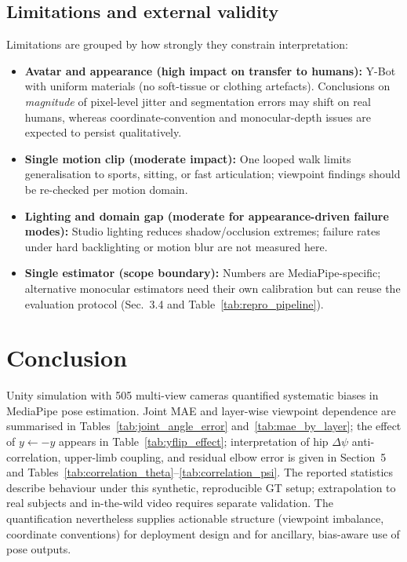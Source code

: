 \documentclass[english,fleqn]{ieej-e}
\begin{document}
\subsection{Limitations and external validity}

Limitations are grouped by how strongly they constrain interpretation:
\begin{itemize}\itemsep2pt
  \item \textbf{Avatar and appearance (high impact on transfer to humans):}
        Y-Bot with uniform materials (no soft-tissue or clothing
        artefacts). Conclusions on \emph{magnitude} of pixel-level jitter
        and segmentation errors may shift on real humans, whereas
        coordinate-convention and monocular-depth issues are expected to
        persist qualitatively.
  \item \textbf{Single motion clip (moderate impact):}
        One looped walk limits generalisation to sports, sitting, or
        fast articulation; viewpoint findings should be re-checked per
        motion domain.
  \item \textbf{Lighting and domain gap (moderate for appearance-driven
        failure modes):}
        Studio lighting reduces shadow/occlusion extremes; failure rates
        under hard backlighting or motion blur are not measured here.
  \item \textbf{Single estimator (scope boundary):}
        Numbers are MediaPipe-specific; alternative monocular estimators
        need their own calibration but can reuse the evaluation protocol
        (Sec.~3.4 and Table~\ref{tab:repro_pipeline}).
\end{itemize}

\section{Conclusion}

Unity simulation with 505 multi-view cameras quantified systematic biases in
MediaPipe pose estimation. Joint MAE and layer-wise viewpoint dependence are
summarised in Tables~\ref{tab:joint_angle_error} and~\ref{tab:mae_by_layer};
the effect of $y \leftarrow -y$ appears in Table~\ref{tab:yflip_effect};
interpretation of hip $\Delta\psi$ anti-correlation, upper-limb coupling, and
residual elbow error is given in Section~5 and
Tables~\ref{tab:correlation_theta}--\ref{tab:correlation_psi}.
The reported statistics describe behaviour under this synthetic, reproducible
GT setup; extrapolation to real subjects and in-the-wild video requires
separate validation. The quantification nevertheless supplies actionable
structure (viewpoint imbalance, coordinate conventions) for deployment design
and for ancillary, bias-aware use of pose outputs.
\end{document}
